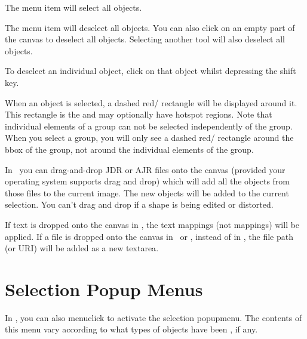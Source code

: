 
The  menu item will select all
\glspl{object}.


The  menu item will deselect all
\glspl{object}. You can also click on
an empty part of the \gls{canvas} to deselect all \glspl{object}.
Selecting another tool will also deselect all \glspl*{object}.

\begin{information}
To deselect an individual \gls*{object}, click on that object whilst
depressing the shift  key.
\end{information}

When an \gls{object} is selected, a dashed red\slash{}
rectangle will be displayed around it. This rectangle is the 
\emph{} and may optionally have
\gls{hotspot} regions. Note that individual elements of a
\gls{group} can not be selected independently of the group.  When
you select a group, you will only see a dashed
red\slash{} rectangle around the \gls{bbox} of the group,
not around the individual elements of the group.

In \selectmode\ you can \gls{drag-and-drop} \gls{JDR} or \gls{AJR}
files onto the \gls{canvas} (provided your operating system supports
drag and drop) which will add all the objects from those files to
the current image. The new objects will be added to the current
selection. You can't drag and drop if a shape is being edited or
distorted.

If text is dropped onto the \gls{canvas} in \selectmode, the text
mappings (not  mappings) will be applied. If a file is
dropped onto the \gls{canvas} in \textmode\ or \mathsmode, instead of
in \selectmode, the file path (or URI) will be added as a new \gls{textarea}.

\section{Selection Popup Menus}
\label{sec:selectpopups}

In \selectmode, you can also \gls{menuclick} to activate the
selection \gls{popupmenu}. The contents of this menu vary according to
what types of \glspl*{object} have been \selected, if any.



